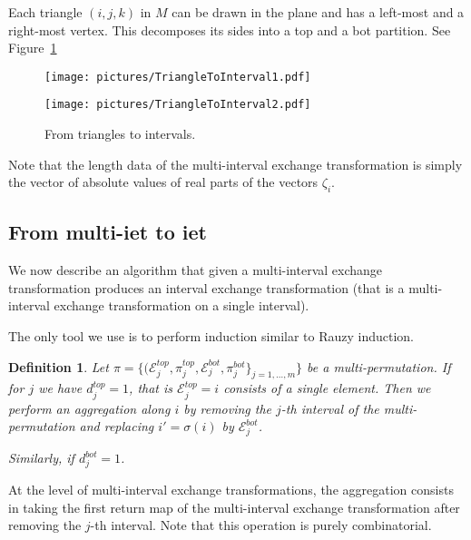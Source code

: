 \documentclass{article}
\def\cE{\mathcal{E}}
\newtheorem{definition}{Definition}
\begin{document}
Each triangle $(i,j,k)$ in $M$ can be drawn in the plane and has a left-most and
a right-most vertex. This decomposes its sides into a top and a bot partition.
See Figure~\ref{fig:FromTrianglesToIntervals}
\begin{figure}[!ht]
\begin{minipage}{0.4\textwidth}
\begin{center}
\texttt{[image: pictures/TriangleToInterval1.pdf]}
\end{center}
\end{minipage}
\hspace{.1\textwidth}
\begin{minipage}{0.4\textwidth}
\begin{center}
\texttt{[image: pictures/TriangleToInterval2.pdf]}
\end{center}
\end{minipage}
\caption{From triangles to intervals.}
\label{fig:FromTrianglesToIntervals}
\end{figure}

Note that the length data of the multi-interval exchange transformation is
simply the vector of absolute values of real parts of the vectors $\zeta_i$.

\subsection{From multi-iet to iet}
We now describe an algorithm that given a multi-interval exchange transformation
produces an interval exchange transformation (that is a multi-interval exchange
transformation on a single interval).

The only tool we use is to perform induction similar to Rauzy induction.
\begin{definition}
Let
$\pi = \{(\cE^{top}_j, \pi^{top}_j, \cE^{bot}_j, \pi^{bot}_j\}_{j=1,\ldots,m}\}$
be a multi-permutation.
If for $j$ we have $d_j^{top} = 1$, that is $\cE^{top}_j = {i}$ consists of a single
element. Then we perform an \emph{aggregation along $i$} by removing the
$j$-th interval of the multi-permutation and replacing
$i' = \sigma(i)$ by $\cE^{bot}_j$.

Similarly, if $d_j^{bot} = 1$.
\end{definition}
At the level of multi-interval exchange transformations, the aggregation
consists in taking the first return map of the multi-interval
exchange transformation after removing the $j$-th interval. Note that this
operation is purely combinatorial.
\end{document}
